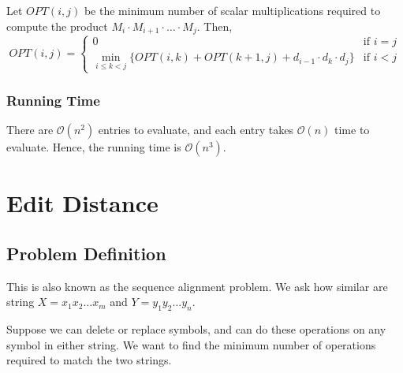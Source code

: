 Let $OPT(i, j)$ be the minimum number of scalar multiplications required to compute the product $M_i \cdot M_{i + 1} \cdot \dots \cdot M_j$. Then, \[
    OPT(i, j) = \begin{cases}
        0                                                                 & \text{if } i = j \\
        \displaystyle
        \min_{i \leq k < j} \{OPT(i, k) + OPT(k + 1, j) + d_{i - 1} \cdot d_k \cdot d_j\} & \text{if } i < j
    \end{cases}
\]

\subsubsection{Running Time}

There are $\mathcal{O}(n^2)$ entries to evaluate, and each entry takes $\mathcal{O}(n)$ time to evaluate. Hence, the running time is $\mathcal{O}(n^3)$.

\section{Edit Distance}

\subsection{Problem Definition}

This is also known as the sequence alignment problem. We ask how similar are string $X = x_1 x_2 \dots x_m$ and $Y = y_1 y_2 \dots y_n$.

Suppose we can {\color{lightBlue}delete} or {\color{darkGreen}replace} symbols, and can do these operations on any symbol in either string. We want to find the minimum number of operations required to match the two strings.

